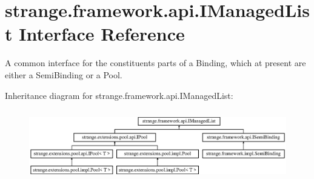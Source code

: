 \hypertarget{interfacestrange_1_1framework_1_1api_1_1_i_managed_list}{\section{strange.\-framework.\-api.\-I\-Managed\-List Interface Reference}
\label{interfacestrange_1_1framework_1_1api_1_1_i_managed_list}
}


A common interface for the constituents parts of a Binding, which at present are either a Semi\-Binding or a Pool.  


Inheritance diagram for strange.\-framework.\-api.\-I\-Managed\-List\-:\begin{figure}[H]
\begin{center}
\leavevmode
\includegraphics[height=3.124128cm]{interfacestrange_1_1framework_1_1api_1_1_i_managed_list}
\end{center}
\end{figure}
